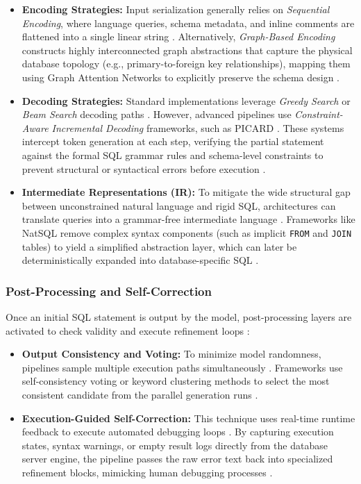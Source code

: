 \begin{itemize}
   \item \textbf{Encoding Strategies:} Input serialization generally relies on \textit{Sequential Encoding}, where language queries, schema metadata, and inline comments are flattened into a single linear string \cite{Text_to_SQL_in_the_Era_of_LLMs}. Alternatively, \textit{Graph-Based Encoding} constructs highly interconnected graph abstractions that capture the physical database topology (e.g., primary-to-foreign key relationships), mapping them using Graph Attention Networks to explicitly preserve the schema design \cite{Text_to_SQL_in_the_Era_of_LLMs}.
   \item \textbf{Decoding Strategies:} Standard implementations leverage \textit{Greedy Search} or \textit{Beam Search} decoding paths \cite{Text_to_SQL_in_the_Era_of_LLMs}. However, advanced pipelines use \textit{Constraint-Aware Incremental Decoding} frameworks, such as PICARD \cite{Text_to_SQL_in_the_Era_of_LLMs}. These systems intercept token generation at each step, verifying the partial statement against the formal SQL grammar rules and schema-level constraints to prevent structural or syntactical errors before execution \cite{Text_to_SQL_in_the_Era_of_LLMs}.
   \item \textbf{Intermediate Representations (IR):} To mitigate the wide structural gap between unconstrained natural language and rigid SQL, architectures can translate queries into a grammar-free intermediate language \cite{Text_to_SQL_in_the_Era_of_LLMs}. Frameworks like NatSQL remove complex syntax components (such as implicit \texttt{FROM} and \texttt{JOIN} tables) to yield a simplified abstraction layer, which can later be deterministically expanded into database-specific SQL \cite{Text_to_SQL_in_the_Era_of_LLMs}.
\end{itemize}

\subsubsection{Post-Processing and Self-Correction}
Once an initial SQL statement is output by the model, post-processing layers are activated to check validity and execute
refinement loops \cite{Text_to_SQL_in_the_Era_of_LLMs}:

\begin{itemize}
   \item \textbf{Output Consistency and Voting:} To minimize model randomness, pipelines sample multiple execution paths simultaneously \cite{Text_to_SQL_in_the_Era_of_LLMs}. Frameworks use self-consistency voting or keyword clustering methods to select the most consistent candidate from the parallel generation runs \cite{Text_to_SQL_in_the_Era_of_LLMs}.
   \item \textbf{Execution-Guided Self-Correction:} This technique uses real-time runtime feedback to execute automated debugging loops \cite{Text_to_SQL_in_the_Era_of_LLMs}. By capturing execution states, syntax warnings, or empty result logs directly from the database server engine, the pipeline passes the raw error text back into specialized refinement blocks, mimicking human debugging processes \cite{Text_to_SQL_in_the_Era_of_LLMs}.
\end{itemize}

